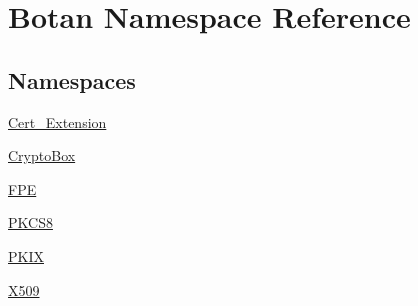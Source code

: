 \hypertarget{namespace_botan}{}\section{Botan Namespace Reference}
\label{namespace_botan}
\subsection*{Namespaces}
\begin{DoxyCompactItemize}
\item 
 \mbox{\hyperlink{namespace_botan_1_1_cert___extension}{Cert\+\_\+\+Extension}}
\item 
 \mbox{\hyperlink{namespace_botan_1_1_crypto_box}{Crypto\+Box}}
\item 
 \mbox{\hyperlink{namespace_botan_1_1_f_p_e}{F\+PE}}
\item 
 \mbox{\hyperlink{namespace_botan_1_1_p_k_c_s8}{P\+K\+C\+S8}}
\item 
 \mbox{\hyperlink{namespace_botan_1_1_p_k_i_x}{P\+K\+IX}}
\item 
 \mbox{\hyperlink{namespace_botan_1_1_x509}{X509}}
\end{DoxyCompactItemize}

